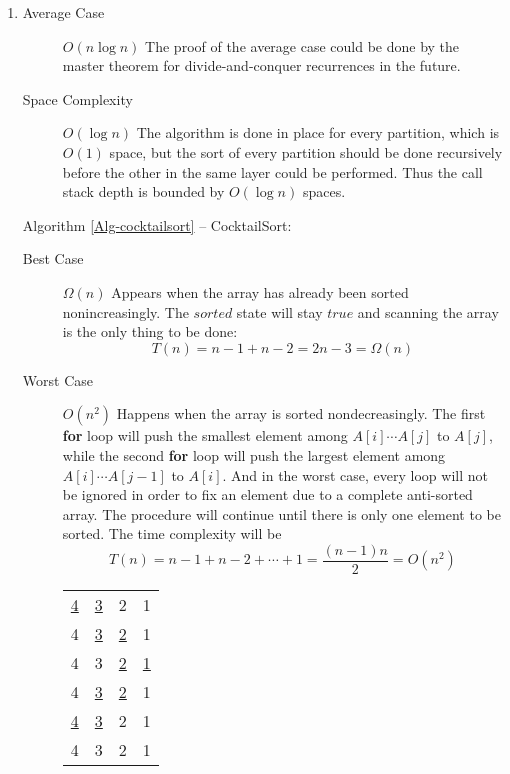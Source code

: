 \documentclass[12pt,a4paper]{article}
\makeatletter
\newtheorem*{solution}{Solution}
\theoremstyle{definition}
\renewenvironment{solution}[1][Solution] {\par\pushQED{\qed}\normalfont\topsep6\p@\@plus6\p@\relax\trivlist\item[\hskip\labelsep\bfseries#1\@addpunct{.}]\ignorespaces}{\popQED\endtrivlist\@endpefalse} \makeatother
\makeatother
\begin{document}
\begin{enumerate}
\begin{solution}
\begin{enumerate}
\begin{description}
			\item[Average Case] $O(n\log n)$ The proof of the average case could be done by the master theorem for divide-and-conquer recurrences in the future.
			\item[Space Complexity] $O(\log n)$ The algorithm is done in place for every partition, which is $O(1)$ space, but the sort of every partition should be done recursively before the other in the same layer could be performed. Thus the call stack depth is bounded by $O(\log n)$ spaces.
		\end{description}
		Algorithm \ref{Alg-cocktailsort} -- CocktailSort:
		\begin{description}
			\item[Best Case] $\Omega(n)$ Appears when the array has already been sorted nonincreasingly. The $sorted$ state will stay $true$ and scanning the array is the only thing to be done:
			\begin{equation*}
				T(n) = n-1 + n-2 = 2n - 3 = \Omega(n)
			\end{equation*} 
			\item[Worst Case] $O(n^2)$ Happens when the array is sorted nondecreasingly. The first \textbf{for} loop will push the smallest element among $A[i] \cdots A[j]$ to $A[j]$, while the second \textbf{for} loop will push the largest element among $A[i] \cdots A[j-1]$ to $A[i]$. And in the worst case, every loop will not be ignored in order to fix an element due to a complete anti-sorted array. The procedure will continue until there is only one element to be sorted. The time complexity will be 
			\begin{equation*}
				T(n) = n-1 + n-2 + \cdots + 1 = \frac{(n-1)n}{2} = O(n^2)
			\end{equation*}
			
			\begin{minipage}[t]{0.4\textwidth}
				\begin{table}[H]
					\centering
					\begin{tabular}{cccc}
						\underline{4} & \underline{3} & 2 & 1\\
						4 & \underline{3} & \underline{2} & 1\\
						4 & 3 & \underline{2} & \underline{1}\\
						4 & \underline{3} & \underline{2} & 1\\
						\underline{4} & \underline{3} & 2 & 1\\
						4 & 3 & 2 & 1
					\end{tabular}	


\end{table}
\end{minipage}
\end{description}
\end{enumerate}
\end{solution}
\end{enumerate}
\end{document}
